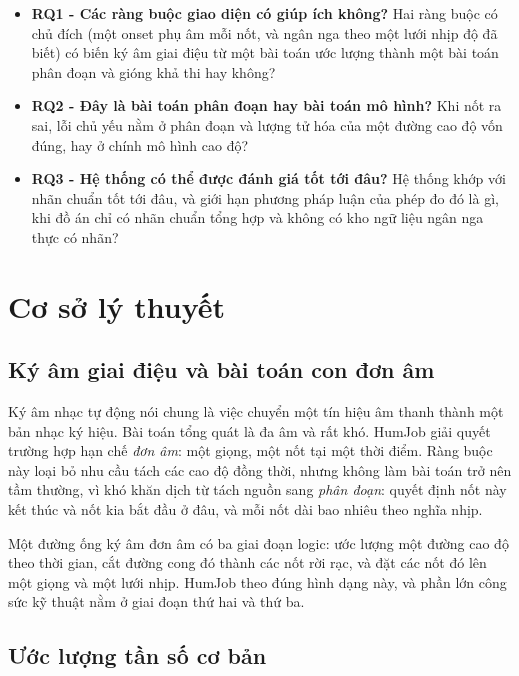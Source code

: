 \documentclass[12pt,a4paper]{article}
\begin{document}
\begin{itemize}
    \item \textbf{RQ1 - Các ràng buộc giao diện có giúp ích không?} Hai ràng buộc
    có chủ đích (một onset phụ âm mỗi nốt, và ngân nga theo một lưới nhịp độ đã
    biết) có biến ký âm giai điệu từ một bài toán ước lượng thành một bài toán phân
    đoạn và gióng khả thi hay không?
    \item \textbf{RQ2 - Đây là bài toán phân đoạn hay bài toán mô hình?} Khi nốt
    ra sai, lỗi chủ yếu nằm ở phân đoạn và lượng tử hóa của một đường cao độ vốn
    đúng, hay ở chính mô hình cao độ?
    \item \textbf{RQ3 - Hệ thống có thể được đánh giá tốt tới đâu?} Hệ thống khớp
    với nhãn chuẩn tốt tới đâu, và giới hạn phương pháp luận của phép đo đó là gì,
    khi đồ án chỉ có nhãn chuẩn tổng hợp và không có kho ngữ liệu ngân nga thực có
    nhãn?
\end{itemize}

\section{Cơ sở lý thuyết}

\subsection{Ký âm giai điệu và bài toán con đơn âm}

Ký âm nhạc tự động nói chung là việc chuyển một tín hiệu âm thanh thành một bản
nhạc ký hiệu. Bài toán tổng quát là đa âm và rất khó. HumJob giải quyết trường hợp
hạn chế \emph{đơn âm}: một giọng, một nốt tại một thời điểm. Ràng buộc này loại bỏ
nhu cầu tách các cao độ đồng thời, nhưng không làm bài toán trở nên tầm thường, vì
khó khăn dịch từ tách nguồn sang \emph{phân đoạn}: quyết định nốt này kết thúc và
nốt kia bắt đầu ở đâu, và mỗi nốt dài bao nhiêu theo nghĩa nhịp.

Một đường ống ký âm đơn âm có ba giai đoạn logic: ước lượng một đường cao độ theo
thời gian, cắt đường cong đó thành các nốt rời rạc, và đặt các nốt đó lên một giọng
và một lưới nhịp. HumJob theo đúng hình dạng này, và phần lớn công sức kỹ thuật nằm
ở giai đoạn thứ hai và thứ ba.

\subsection{Ước lượng tần số cơ bản}
\end{document}
